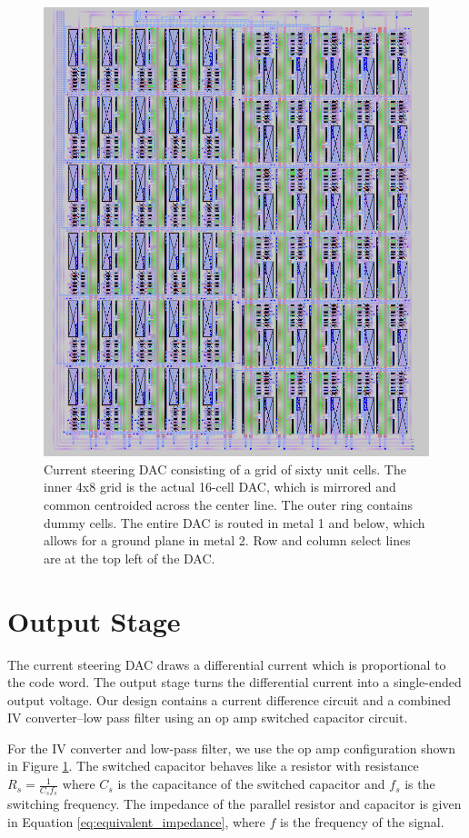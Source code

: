 \documentclass{article}
\begin{document}
\begin{figure}[H]
    \centering{}
    \includegraphics[width=1.0\columnwidth]{images/current_steering_dac_layout.png}
    \caption{Current steering DAC consisting of a grid of sixty unit cells. The inner 4x8 grid is the actual 16-cell DAC, which is mirrored and common centroided across the center line. The outer ring contains dummy cells. The entire DAC is routed in metal 1 and below, which allows for a ground plane in metal 2. Row and column select lines are at the top left of the DAC.}
    \label{fig:dac_layout}
\end{figure}

\section{Output Stage}
The current steering DAC draws a differential current which is proportional to the code word. The output stage turns the differential current into a single-ended output voltage. Our design contains a current difference circuit and a combined IV converter–low pass filter using an op amp switched capacitor circuit.

For the IV converter and low-pass filter, we use the op amp configuration shown in Figure \ref{}. The switched capacitor behaves like a resistor with resistance $R_s = \frac{1}{C_s f_s}$ where $C_s$ is the capacitance of the switched capacitor and $f_s$ is the switching frequency. The impedance of the parallel resistor and capacitor is given in Equation \ref{eq:equivalent_impedance}, where $f$ is the frequency of the signal.
\end{document}
